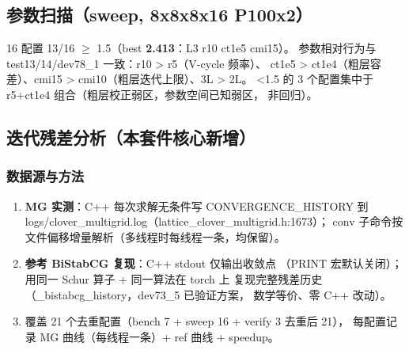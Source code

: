 \documentclass[UTF8]{ctexart}
\begin{document}
\subsection{参数扫描（sweep, 8x8x8x16 P100x2）}
16 配置 13/16 $\ge$ 1.5（best \textbf{2.413}：L3 r10 ct1e5 cmi15）。
参数相对行为与 test13/14/dev78\_1 一致：r10 > r5（V-cycle 频率）、
ct1e5 > ct1e4（粗层容差）、cmi15 > cmi10（粗层迭代上限）、3L > 2L。
<1.5 的 3 个配置集中于 r5+ct1e4 组合（粗层校正弱区，参数空间已知弱区，
非回归）。

\subsection{迭代残差分析（本套件核心新增）}
\subsubsection{数据源与方法}
\begin{enumerate}
\item \textbf{MG 实测}：C++ 每次求解无条件写 CONVERGENCE\_HISTORY 到
  logs/clover\_multigrid.log（lattice\_clover\_multigrid.h:1673）；
  conv 子命令按文件偏移增量解析（多线程时每线程一条，均保留）。
\item \textbf{参考 BiStabCG 复现}：C++ stdout 仅输出收敛点
  （PRINT 宏默认关闭）；用同一 Schur 算子 + 同一算法在 torch 上
  复现完整残差历史（\_bistabcg\_history，dev73\_5 已验证方案，
  数学等价、零 C++ 改动）。
\item 覆盖 21 个去重配置（bench 7 + sweep 16 + verify 3 去重后 21），
  每配置记录 MG 曲线（每线程一条）+ ref 曲线 + speedup。
\end{enumerate}
\end{document}
